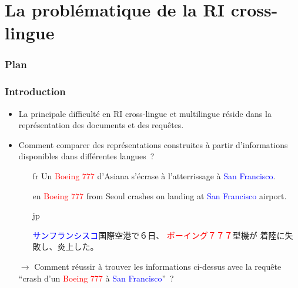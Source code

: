 \documentclass[12pt,aspectratio=43,dvipsnames,table]{beamer}
\begin{document}
\section{La problématique de la RI cross-lingue}


\begin{frame}
\frametitle{Plan}
\tableofcontents[sectionstyle=show,subsectionstyle=hide,subsubsectionstyle=hide]
\end{frame}


\begin{frame}
    \frametitle{Introduction}
    \begin{itemize} \itemsep10pt
        \item La principale difficulté en RI cross-lingue et multilingue réside 
              dans la représentation des documents et des requêtes.
        \item Comment comparer des représentations construites à partir 
              d'informations disponibles dans différentes langues~?

        \begin{itemize} 
          \item[fr] Un \textcolor<2>{red}{Boeing 777} d'Asiana 
                    s'\textcolor<2>{JungleGreen}{écrase} à l'atterrissage à 
                    \textcolor<2>{blue}{San Francisco}.
          \item[en] \textcolor<2>{red}{Boeing 777} from Seoul 
                    \textcolor<2>{JungleGreen}{crashes} on landing at 
                    \textcolor<2>{blue}{San Francisco} airport.
          \item[jp] \begin{CJK*}{UTF8}{min}
                    \textcolor<2>{blue}{サンフランシスコ}国際空港で６日、
                    \textcolor<2>{red}{ボーイング７７７}型機が
                    \textcolor<2>{JungleGreen}{着陸に失敗し}、炎上した。
                    \end{CJK*}
        \end{itemize}
        \item[$\to$] Comment réussir à trouver les informations ci-dessus avec 
                     la requête ``\textcolor<2>{JungleGreen}{crash} d'un 
                     \textcolor<2>{red}{Boeing 777} à 
                     \textcolor<2>{blue}{San Francisco}''~?
    \end{itemize}
\end{frame}
\end{document}
